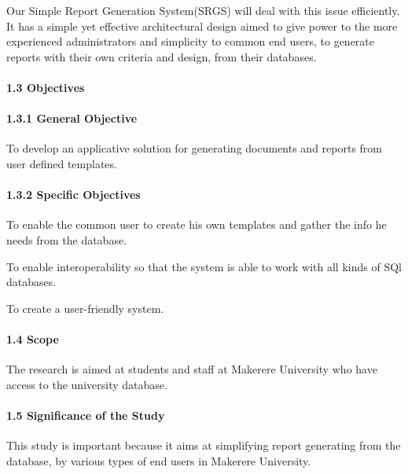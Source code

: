 \documentclass[10pt,a4paper]{report}
\begin{document}
\begin{flushleft}
Our Simple Report Generation System(SRGS) will deal with this issue efficiently. It has a simple yet effective architectural design aimed to give power to the more experienced administrators and simplicity to common end users, to generate reports with their own criteria and design, from their databases.
\end{flushleft}

\paragraph{1.3	Objectives}
\paragraph{1.3.1  General Objective}
\begin{flushleft}
To develop an applicative solution for generating documents and reports from user defined templates.
\end{flushleft}

\paragraph{1.3.2  Specific Objectives}
\begin{flushleft}
To enable the common user to create his own templates and gather the info he needs from the database.
\end{flushleft}

\begin{flushleft}
To enable interoperability so that the system is able to work with all kinds of SQl databases.
\end{flushleft}

\begin{flushleft}
To create a user-friendly system.
\end{flushleft}

\paragraph{1.4  Scope}
\begin{flushleft}
The research is aimed at students and staff at Makerere University who have access to the university database. 
\end{flushleft}

\paragraph{1.5  Significance of the Study}
\begin{flushleft}
This study is important because it aims at simplifying report generating from the database, by various types of end users in Makerere University.
\end{flushleft}
\end{document}
